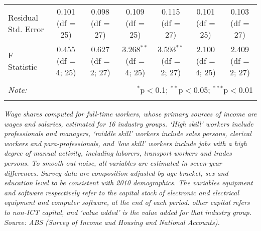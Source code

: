 \begin{sidewaystable}
\begin{center}
\begin{tabular}{@{\extracolsep{5pt}}lcccccc}
Residual Std. Error & 0.101 (df = 25) & 0.098 (df = 27) & 0.109 (df = 25) & 0.115 (df = 27) & 0.101 (df = 25) & 0.103 (df = 27) \\ 
F Statistic & 0.455 (df = 4; 25) & 0.627 (df = 2; 27) & 3.268$^{**}$ (df = 4; 25) & 3.593$^{**}$ (df = 2; 27) & 2.100 (df = 4; 25) & 2.409 (df = 2; 27) \\ 
\hline 
\hline \\[-1.8ex] 
\textit{Note:}  & \multicolumn{6}{r}{$^{*}$p$<$0.1; $^{**}$p$<$0.05; $^{***}$p$<$0.01} \\ 
\normalsize 
\end{tabular} 
\end{center}
{\em Wage shares computed for full-time workers, whose primary sources of income are wages and salaries, estimated for 16 industry groups. `High skill' workers include professionals and managers, `middle skill' workers include sales persons, clerical workers and para-professionals, and `low skill' workers include jobs with a high degree of manual activity, including laborers, transport workers and trades persons. To smooth out noise, all variables are estimated in seven-year differences. Survey data are composition adjusted by age bracket, sex and education level to be consistent with 2010 demographics. The variables {\em equipment} and {\em software} respectively refer to the capital stock of electronic and electrical equipment and computer software, at the end of each period. {\em other capital} refers to non-ICT capital, and {\em `value added'} is the value added for that industry group. Source: ABS (Survey of Income and Housing and National Accounts).}
\end{sidewaystable} 
